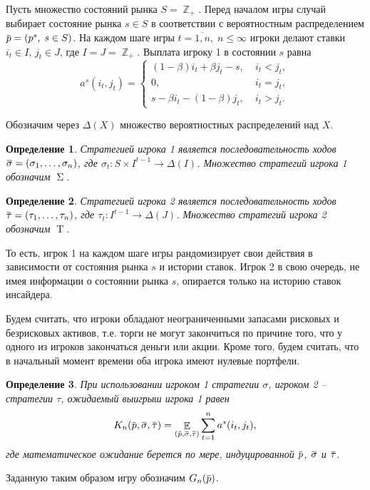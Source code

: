 \documentclass[12pt, draft]{extarticle}
\newtheorem{definition}{Определение}
\newcommand{\overbar}[1]%
{\mkern 1.5mu\overline{\mkern-1.3mu#1\mkern-1.3mu}\mkern 1.3mu}
\newcommand{\s}{\ensuremath{s}}
\newcommand{\p}{\ensuremath{\overbar{p}}}
\DeclareMathOperator{\E}{\mathbb{E}}
\DeclareMathOperator{\Z}{\mathbb{Z}}
\newcommand{\G}[1][n]{\ensuremath{G_{#1}}}
\newcommand{\K}[1][n]{\ensuremath{K_{#1}}}
\DeclareMathOperator{\FPStrategies}{\Sigma}
\DeclareMathOperator{\SPStrategies}{\mathrm{T}}
\newcommand{\sigmav}{\ensuremath{\overbar{\sigma}}}
\newcommand{\tauv}{\ensuremath{\overbar{\tau}}}
\begin{document}
Пусть множество состояний рынка $S = \Z_+$. Перед началом игры случай выбирает
состояние рынка $\s \in S$ в соответствии с вероятностным распределением $\p =
(p^s, \; s \in S)$. На каждом шаге игры $t = \overline{1,n}, \; n \leqslant
\infty$ игроки делают ставки $i_t \in I, \, j_t \in J$, где $I = J = \Z_+$.
Выплата игроку 1 в состоянии $s$ равна
\begin{equation*}
  a^s(i_t, j_t) =
  \begin{cases}
    (1-\beta) i_t + \beta j_t - s, &\; i_t < j_t, \\
    0, &\; i_t = j_t, \\
    s - \beta i_t - (1-\beta)j_t, &\; i_t > j_t.
  \end{cases}
\end{equation*}

Обозначим через $\Delta(X)$ множество вероятностных распределений над $X$.
\begin{definition}
  Стратегией игрока 1 является последовательность ходов $\sigmav = (\sigma_1,
  \ldots, \sigma_n)$, где $\sigma_t: S \times I^{t-1} \rightarrow \Delta(I)$.
  Множество стратегий игрока 1 обозначим $\FPStrategies$.
\end{definition}

\begin{definition}
  Стратегией игрока 2 является последовательность ходов $\tauv = (\tau_1,
  \ldots, \tau_n)$, где $\tau_t: I^{t-1} \rightarrow \Delta(J)$. Множество
  стратегий игрока 2 обозначим $\SPStrategies$.
\end{definition}

То есть, игрок 1 на каждом шаге игры рандомизирует свои действия в зависимости
от состояния рынка $s$ и истории ставок. Игрок 2 в свою очередь, не имея
информации о состоянии рынка $s$, опирается только на историю ставок инсайдера.

Будем считать, что игроки обладают неограниченными запасами рисковых и
безрисковых активов, т.е. торги не могут закончиться по причине того, что у
одного из игроков закончаться деньги или акции. Кроме того, будем считать, что в
начальный момент времени оба игрока имеют нулевые портфели.

\begin{definition}
  При использовании игроком 1 стратегии $\sigma$, игроком 2 -- стратегии $\tau$,
  ожидаемый выигрыш игрока 1 равен
  \begin{equation*}
    \K(\p, \sigmav, \tauv) =
    \E_{(\p, \sigmav, \tauv)} \sum_{t=1}^n a^s(i_t, j_t),
  \end{equation*}
  где математическое ожидание берется по мере, индуцированной $\p$, $\sigmav$ и
  $\tauv$.
\end{definition}
Заданную таким образом игру обозначим $\G(\p)$.
\end{document}
